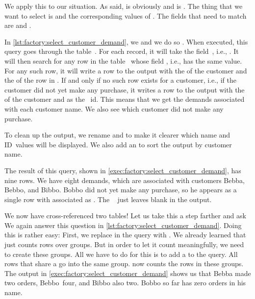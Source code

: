 We apply this to our situation.
As said,  is obviously  and  is .
The thing that we want to select is  and the corresponding values of .
The fields that need to match are  and .%
%
\begin{sloppypar}%
In \cref{lst:factory:select_customer_demand}, we  and we do so .
When executed, this query goes through the table~.
For each record, it will take the field~, i.e., .
It will then search for any row in the table~ whose field , i.e.,  has the same value.
For any such row, it will write a row to the output with the  of the customer and the  of the row in .
If and only if no such row exists for a customer, i.e., if the customer did not yet make any purchase, it writes a row to the output with the  of the customer and  as the ~id.
This means that we get the demands associated with each customer name.
We also see which customer did not make any purchase.%
\end{sloppypar}%
%
To clean up the output, we rename  and  to make it clearer which name and ID~values will be displayed.
We also add an  to sort the output by customer name.

The result of this query, shown in \cref{exec:factory:select_customer_demand}, has nine rows.
We have eight demands, which are associated with customers Bebba, Bebbo, and Bibbo.
Bobbo did not yet make any purchase, so he appears as a single row with  associated as .
The \psql\  just leaves  blank in the output.

We now have cross-referenced two tables!
Let us take this a step farther and ask 
We again answer this question in \cref{lst:factory:select_customer_demand}.
Doing this is rather easy:
First, we replace  in the query with .
We already learned that  just counts rows over groups.
But in order to let it count meaningfully, we need to create these groups.
All we have to do for this is to add a  to the query.
All rows that share a  go into the same group.
 now counts the rows in these groups.
The output in \cref{exec:factory:select_customer_demand} shows us that Bebba made two orders, Bebbo~four, and Bibbo also two.
Bobbo so far has zero orders in his name.

